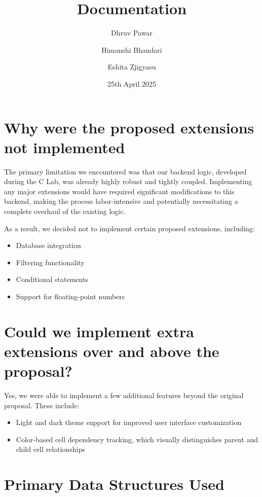 \documentclass{article}
\title{Documentation}
\author{Dhruv Pawar \and Himanshi Bhandari \and Eshita Zjigyasu}
\date{25th April 2025}
\begin{document}
\maketitle

\section*{Why were the proposed extensions not implemented}

The primary limitation we encountered was that our backend logic, developed during the C Lab, was already highly robust and tightly coupled. Implementing any major extensions would have required significant modifications to this backend, making the process labor-intensive and potentially necessitating a complete overhaul of the existing logic.

As a result, we decided not to implement certain proposed extensions, including:
\begin{itemize}
    \item Database integration
    \item Filtering functionality
    \item Conditional statements
    \item Support for floating-point numbers
\end{itemize}

\section*{Could we implement extra extensions over and above the proposal?}

Yes, we were able to implement a few additional features beyond the original proposal. These include:

\begin{itemize}
    \item Light and dark theme support for improved user interface customization
    \item Color-based cell dependency tracking, which visually distinguishes parent and child cell relationships
\end{itemize}

\section*{Primary Data Structures Used}
\end{document}
